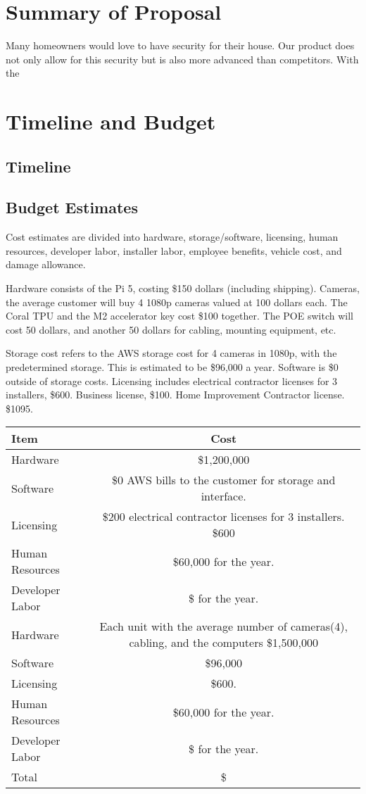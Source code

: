 \documentclass{report}
\begin{document}
\chapter{Summary of Proposal}
Many homeowners would love to have security for their house. 
Our product does not only allow for this security but is also more advanced than competitors.
With the 


\chapter{Timeline and Budget}
\section{Timeline}

\section{Budget Estimates}
Cost estimates are divided into hardware, 
storage/software, licensing, human resources,
developer labor, installer labor, employee benefits, 
vehicle cost, and damage allowance.

Hardware consists of the Pi 5, costing \$150 dollars (including shipping). Cameras, 
the average customer will buy 4 1080p cameras valued at 100 dollars each. 
The Coral TPU and the M2 accelerator key cost \$100 together.
The POE switch will cost 50 dollars, and another 50 dollars for cabling, mounting equipment, etc.

Storage cost refers to the AWS storage cost for 4 cameras in 1080p, with the predetermined storage. This is estimated to be \$96,000 a year.
Software is \$0 outside of storage costs.
Licensing includes electrical contractor licenses for 3 installers, \$600. Business license, \$100. 
Home Improvement Contractor license. \$1095.
\begin{tabular}{|l|c|}
\hline
Item & Cost \\
\hline
Hardware & \$1,200,000 \\
Software & \$0 AWS bills to the customer for storage and interface. \\
Licensing & \$200 electrical contractor licenses for 3 installers. \$600 \\
Human Resources & \$60,000 for the year. \\
Developer Labor & \$ for the year. \\
Hardware & Each unit with the average number of cameras(4),
cabling, and the computers \$1,500,000\\
Software & \$96,000\\
Licensing & \$600. \\
Human Resources & \$60,000 for the year.\\
Developer Labor & \$ for the year.\\
\hline
Total & \$ \\
\hline
\end{tabular}
\end{document}
